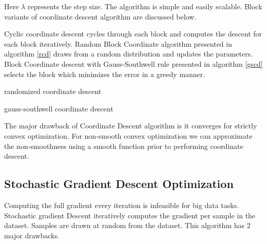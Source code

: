\documentclass[sigconf]{acmart}
\begin{document}
Here $\lambda$ represents the step size. The algorithm is simple and easily scalable. Block variants of coordinate descent algorithm are discussed below.

Cyclic coordinate descent cycles through each block and computes the descent for each block iteratively. Random Block Coordinate algorithm \cite{pmlr-v37-nutini15} presented in algorithm \ref{rcd} draws from a random distribution and updates the parameters. Block Coordinate descent with Gauss-Southwell \cite{pmlr-v37-nutini15} rule presented in algorithm \ref{gscd} selects the block which minimizes the error in a greedy manner.

\begin{algorithm}

\caption{randomized coordinate descent} \label{rcd}

\begin{algorithmic}[1] 
\EndFor
\end{algorithmic}

\end{algorithm}

\begin{algorithm}

\caption{gauss-southwell coordinate descent} \label{gscd}

\begin{algorithmic}[1] 
\State{select $i = argmax(\nabla^t f(x_i)]) $ }
\EndFor
\end{algorithmic}

\end{algorithm}

The major drawback of Coordinate Descent algorithm is it converges for strictly convex optimization. For non-smooth convex optimization we can approximate the non-smoothness using a smooth function prior to performing coordinate descent. 

\subsection{Stochastic Gradient Descent Optimization}

Computing the full gradient every iteration is infeasible for big data tasks. Stochastic gradient Descent \cite{Bottou2010} iteratively computes the gradient per sample in the dataset. Samples are drawn at random from the dataset. This algorithm has 2 major drawbacks.
\end{document}
